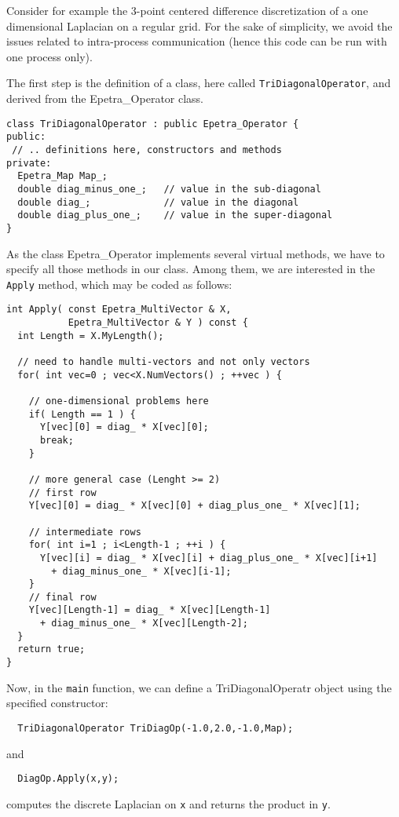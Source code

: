 Consider for example the 3-point centered difference discretization of a
one dimensional Laplacian on a regular grid. For the sake of simplicity,
we avoid the issues related to intra-process communication (hence this
code can be run with one process only).

The first step is the definition of a class, here called
\verb!TriDiagonalOperator!, and derived from the Epetra\_Operator class.
\begin{verbatim}
class TriDiagonalOperator : public Epetra_Operator {
public:
 // .. definitions here, constructors and methods
private:
  Epetra_Map Map_;
  double diag_minus_one_;   // value in the sub-diagonal
  double diag_;             // value in the diagonal
  double diag_plus_one_;    // value in the super-diagonal
}
\end{verbatim}
As the class  Epetra\_Operator implements several virtual methods, we
have to specify all those methods in our class. Among them, we are
interested in the \verb!Apply! method, which may be coded as follows:
\begin{verbatim}
int Apply( const Epetra_MultiVector & X, 
           Epetra_MultiVector & Y ) const {
  int Length = X.MyLength();
  
  // need to handle multi-vectors and not only vectors
  for( int vec=0 ; vec<X.NumVectors() ; ++vec ) {
    
    // one-dimensional problems here
    if( Length == 1 ) {
      Y[vec][0] = diag_ * X[vec][0];
      break;
    }
    
    // more general case (Lenght >= 2)
    // first row
    Y[vec][0] = diag_ * X[vec][0] + diag_plus_one_ * X[vec][1];
    
    // intermediate rows
    for( int i=1 ; i<Length-1 ; ++i ) {
      Y[vec][i] = diag_ * X[vec][i] + diag_plus_one_ * X[vec][i+1]
        + diag_minus_one_ * X[vec][i-1];
    }
    // final row
    Y[vec][Length-1] = diag_ * X[vec][Length-1]
      + diag_minus_one_ * X[vec][Length-2];
  }
  return true;
}
\end{verbatim}
Now, in the \verb!main! function, we can define a TriDiagonalOperatr object
using the specified constructor:
\begin{verbatim}
  TriDiagonalOperator TriDiagOp(-1.0,2.0,-1.0,Map);
\end{verbatim}
and
\begin{verbatim}
  DiagOp.Apply(x,y);
\end{verbatim}
computes the discrete Laplacian on \verb!x! and returns the product in
\verb!y!. 

